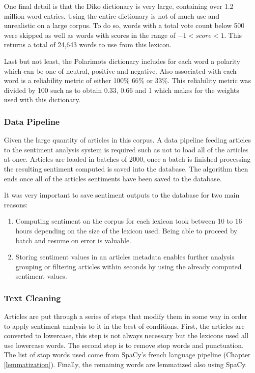 One final detail is that the Diko dictionary is very large, containing over 1.2 million word entries. Using the entire dictionary is not of much use and unrealistic on a large corpus. To do so, words with a total vote count below 500 were skipped as well as words with scores in the range of $-1 < score < 1$. This returns a total of 24,643 words to use from this lexicon.

Last but not least, the Polarimots dictionary includes for each word a polarity which can be one of neutral, positive and negative. Also associated with each word is a reliability metric of either 100\% 66\% or 33\%. This reliability metric was divided by 100 such as to obtain 0.33, 0.66 and 1 which makes for the weights used with this dictionary.

\subsubsection{Data Pipeline}

Given the large quantity of articles in this corpus. A data pipeline feeding articles to the sentiment analysis system is required such as not to load all of the articles at once. Articles are loaded in batches of 2000, once a batch is finished processing the resulting sentiment computed is saved into the database. The algorithm then ends once all of the articles sentiments have been saved to the database.

It was very important to save sentiment outputs to the database for two main reasons:
\begin{enumerate}
    \item Computing sentiment on the corpus for each lexicon took between 10 to 16 hours depending on the size of the lexicon used. Being able to proceed by batch and resume on error is valuable.
    \item Storing sentiment values in an articles metadata enables further analysis grouping or filtering articles within seconds by using the already computed sentiment values.
\end{enumerate}

\subsubsection{Text Cleaning}

Articles are put through a series of steps that modify them in some way in order to apply sentiment analysis to it in the best of conditions. First, the articles are converted to lowercase, this step is not always necessary but the lexicons used all use lowercase words. The second step is to remove stop words and punctuation. The list of stop words used come from SpaCy's french language pipeline (Chapter \ref{lemmatization}). Finally, the remaining words are lemmatized also using SpaCy.


